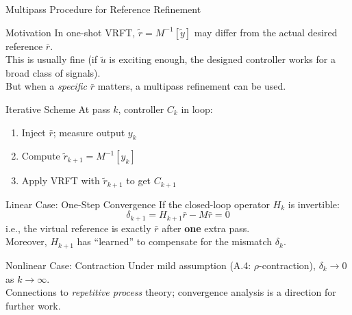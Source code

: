 \documentclass[hyperref={pdfpagemode=FullScreen},aspectratio=169]{beamer}
\newcommand{\highlight}[1]{{\color{accentgreen!70!black}\textbf{#1}}}
\begin{document}
\begin{frame}{Multipass Procedure for Reference Refinement}
      \begin{block}{Motivation}
        In one-shot VRFT, $\tilde{r} = M^{-1}[\tilde{y}]$ may differ from the actual desired reference $\bar{r}$.\\[0.3em]
        This is usually fine (if $\tilde{u}$ is exciting enough, the designed controller works for a broad class of signals).\\[0.3em]
        But when a \emph{specific} $\bar{r}$ matters, a multipass refinement can be used.
      \end{block}
      \vspace{0.4em}
      \begin{block}{Iterative Scheme}
        At pass $k$, controller $C_k$ in loop:
        \begin{enumerate}
          \item Inject $\bar{r}$; measure output $y_k$
          \item Compute $\tilde{r}_{k+1} = M^{-1}[y_k]$
          \item Apply VRFT with $\tilde{r}_{k+1}$ to get $C_{k+1}$
        \end{enumerate}
      \end{block}

\end{frame}

\begin{frame}
      \begin{exampleblock}{Linear Case: One-Step Convergence}
        If the closed-loop operator $H_k$ is invertible:
        \[
          \delta_{k+1} = H_{k+1}\bar{r} - M\bar{r} = 0
        \]
        i.e., the virtual reference is exactly $\bar{r}$ after \highlight{one} extra pass.\\[0.3em]
        Moreover, $H_{k+1}$ has ``learned'' to compensate for the mismatch $\delta_k$.
      \end{exampleblock}
      \vspace{0.3em}
      \begin{block}{Nonlinear Case: Contraction}
        Under mild assumption (A.4: $\rho$-contraction), $\delta_k \to 0$ as $k \to \infty$.\\[0.3em]
        Connections to \emph{repetitive process} theory; convergence analysis is a direction for further work.
      \end{block}
\end{frame}
\end{document}

